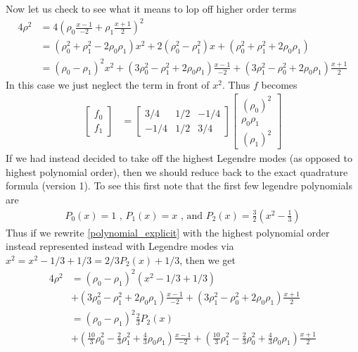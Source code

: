 \documentclass{report}
\numberwithin{equation}{section}
\begin{document}
Now let us check to see what it means to lop off higher  order terms
\begin{align}
    4 \rho^2 &= 4 \left(\rho_0 \frac{x-1}{-2} + \rho_1 \frac{x+1}{2} \right)^2
    \\
    &= (\rho_0^2 + \rho_1^2 - 2 \rho_0 \rho_1) x^2
    + 2(\rho_0^2 - \rho_1^2)x + (\rho_0^2 + \rho_1^2 + 2 \rho_0 \rho_1)
    \\
    \label{polynomial_explicit}
    &= (\rho_0 - \rho_1)^2 x^2 
    + (3 \rho_0^2 - \rho_1^2 + 2\rho_0 \rho_1 )\frac{x-1}{-2} + (3 \rho_1^2 - \rho_0^2 + 2 \rho_0 \rho_1)\frac{x+1}{2}
\end{align}
In this case we just neglect the term in front of $x^2$. Thus $f$ becomes
\begin{align}
        \begin{bmatrix}
    f_0 \\
    f_1
    \end{bmatrix}
    &= 
        \begin{bmatrix}
    3/4 & 1/2 & -1/4 \\
    -1/4 & 1/2 & 3/4
    \end{bmatrix}
        \begin{bmatrix}
    (\rho_0)^2 \\
    \rho_0 \rho_1 \\
    (\rho_1)^2
    \end{bmatrix}
\end{align}
If we had instead decided to take off the highest Legendre modes (as opposed to highest polynomial order), then we should reduce back to the exact quadrature formula (version 1). To see this first note that the first few legendre polynomials are
\begin{align}
    P_0(x) = 1 \text{ , } P_1(x) = x  \text { , and } P_2(x) = \frac{3}{2} \left(x^2 - \frac{1}{3} \right)
\end{align}
Thus if we rewrite \ref{polynomial_explicit} with the highest polynomial order instead represented instead with Legendre modes via $x^2 = x^2 - 1/3 + 1/3 = 2/3 P_2(x) + 1/3$, then we get 
\begin{align}
    \label{polynomial_explicit_legendre}
    4 \rho^2 &= 
    (\rho_0 - \rho_1)^2 (x^2-1/3+1/3) 
    \\
    &+ (3 \rho_0^2 - \rho_1^2 + 2\rho_0 \rho_1 )\frac{x-1}{-2} + (3 \rho_1^2 - \rho_0^2 + 2 \rho_0 \rho_1)\frac{x+1}{2}
    \\
    &= (\rho_0 - \rho_1)^2 \frac{2}{3} P_2(x)
    \\
    &+ \left(\frac{10}{3} \rho_0^2 - \frac{2}{3}\rho_1^2 + \frac{4}{3} \rho_0 \rho_1 \right)\frac{x-1}{-2} + \left(\frac{10}{3} \rho_1^2 - \frac{2}{3} \rho_0^2 + \frac{4}{3} \rho_0 \rho_1  \right)\frac{x+1}{2}
\end{align}
\end{document}
